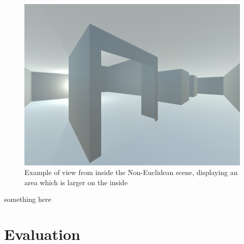 		\begin{figure}[h]
			\label{design:fig:game}
			\includegraphics[width=1\textwidth]{Images/NE_View}
			\centering
			\caption{Example of view from inside the Non-Euclidean scene, displaying an area which is larger on the inside}
		\end{figure}

\begin{multicols*}{2}

	something here

	\section{Evaluation}


\end{multicols*}
